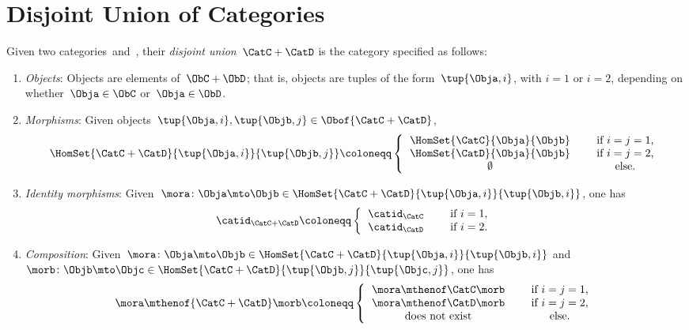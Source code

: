 
\section{Disjoint Union of Categories}

\begin{ctdefinition}
	\label{def:disjoint-union-category}
	Given two categories~\CatC and~\CatD, their \emph{disjoint union}~$\CatC + \CatD$ is the category specified as follows:
	\begin{enumerate}
		\item \emph{Objects}: Objects are elements of~$\ObC + \ObD$; that is, objects are tuples of the form~$\tup{\Obja, i}$, with $i=1$ or $i=2$, depending on whether~$\Obja \in \ObC$ or~$\Obja \in \ObD$.
		\item \emph{Morphisms}: Given objects~$\tup{\Obja, i}, \tup{\Objb, j} \in \Obof{\CatC + \CatD}$,
		      \begin{equation}
			      \HomSet{\CatC + \CatD}{\tup{\Obja, i}}{\tup{\Objb, j}} \coloneqq
			      \left\{
			      \begin{tabular}{ccc}
				      $\HomSet{\CatC}{\Obja}{\Objb}$ &  & if $i=j = 1$,  \\
				      $\HomSet{\CatD}{\Obja}{\Objb}$ &  & if $i = j =2$, \\
				      $\emptyset$                    &  & else.
			      \end{tabular}
			      \right.
		      \end{equation}
		\item \emph{Identity morphisms}: Given~$\mora\colon \Obja \mto \Objb\in \HomSet{\CatC + \CatD}{\tup{\Obja, i}}{\tup{\Objb, i}}$, one has
		      \begin{equation}
			      \catid_{\CatC+\CatD} \coloneqq
			      \left\{
			      \begin{tabular}{ccc}
				      $\catid_\CatC$ &  & if $i=1$, \\
				      $\catid_\CatD$ &  & if $i=2$.
			      \end{tabular}
			      \right.
		      \end{equation}
		\item \emph{Composition}: Given~$\mora\colon \Obja \mto \Objb\in \HomSet{\CatC + \CatD}{\tup{\Obja, i}}{\tup{\Objb, i}}$ and~$\morb\colon \Objb\mto \Objc\in \HomSet{\CatC + \CatD}{\tup{\Objb, j}}{\tup{\Objc, j}}$, one has
		      \begin{equation}
			      \mora \mthenof{\CatC+\CatD} \morb \coloneqq
			      \left\{
			      \begin{tabular}{ccc}
				      $\mora\mthenof\CatC \morb$  &  & if $i=j = 1$,  \\
				      $\mora \mthenof\CatD \morb$ &  & if $i = j =2$, \\
				      does not exist              &  & else.
			      \end{tabular}
			      \right.
		      \end{equation}
	\end{enumerate}
\end{ctdefinition}

